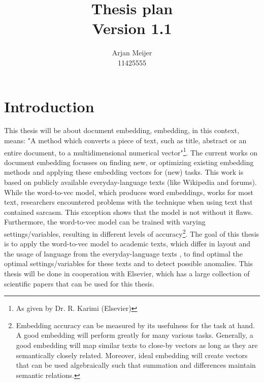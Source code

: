 \documentclass[10pt,a4paper]{article}
\begin{document}
\begin{titlepage}
\title{Thesis plan\\Version 1.1}
\author{Arjan Meijer\\11425555}
\maketitle
\thispagestyle{empty}
\end{titlepage}
\tableofcontents\newpage
\section{Introduction}
This thesis will be about document embedding, embedding, in this context, means: "A method which converts a piece of text, such as title, abstract or an entire document, to a multidimensional numerical vector"\footnote{As given by Dr. R. Karimi (Elsevier)}. The current works on document embedding focusses on finding new, or optimizing existing embedding methods and applying these embedding vectors for (new) tasks. This work is based on publicly available everyday-language texts (like Wikipedia and forums). While the word-to-vec model, which produces word embeddings, works for most text, researchers encountered problems with the technique when using text that contained sarcasm\cite{le2014distributed}. This exception shows that the model is not without it flaws. Furthermore, the word-to-vec model can be trained with varying settings/variables, resulting in different levels of accuracy\footnote{Embedding accuracy can be measured by its usefulness for the task at hand.  A good embedding will perform greatly for many various tasks. Generally, a good embedding will map similar texts to close-by vectors as long as they are semantically closely related. Moreover, ideal embedding will create vectors that can be used algebraically such that summation and differences maintain semantic relations.}. The goal of this thesis is to apply the word-to-vec model to academic texts, which differ in layout and the usage of language from the everyday-language texts , to find optimal the optimal settings/variables for these texts and to detect possible anomalies. This thesis will be done in cooperation with Elsevier, which has a large collection of scientific papers that can be used for this thesis.
\newpage
\end{document}
